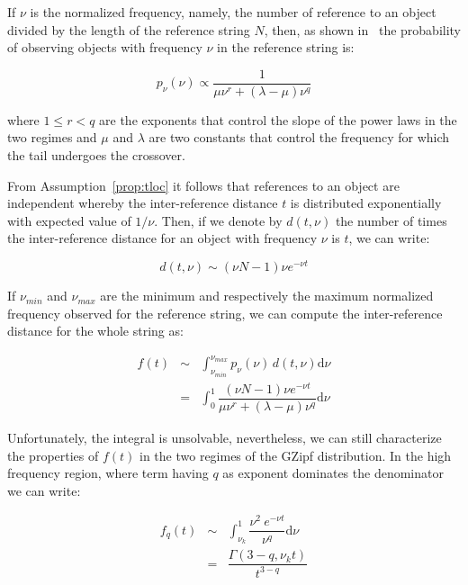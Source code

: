 \documentclass[twocolumn, 10pt]{article}
\theoremstyle{plain}
\begin{document}
If $\nu$ is the normalized frequency, namely, the number of reference to an
object divided by the length of the reference string $N$, then, as shown
in~\cite{montemurro:gzipf} the probability of observing objects with frequency
$\nu$ in the reference string is:

\begin{equation}
    p_{\nu}(\nu)\propto\dfrac{1}{\mu\nu^r+(\lambda-\mu)\nu^q}
    \label{eq:gzipf_pdf}
\end{equation}

\noindent where $1 \le r<q$ are the exponents that control the slope of the
power laws in the two regimes and $\mu$ and $\lambda$ are two constants that
control the frequency for which the tail undergoes the crossover. 

From Assumption~\ref{prop:tloc} it follows that references to an object are
independent whereby the inter-reference distance $t$ is distributed exponentially
with expected value of $1/\nu$. Then, if we denote by $d(t, \nu)$ the
number of times the inter-reference distance for an object with frequency
$\nu$ is $t$, we can write:

\begin{equation}
    d(t, \nu) \sim (\nu N-1) \nu e^{-\nu t} 
    \label{eq:dtf}
\end{equation}

If $\nu_{min}$ and $\nu_{max}$ are the minimum and respectively the
maximum normalized frequency observed for the reference string, we can compute
the inter-reference distance for the whole string as:

\begin{eqnarray}
    f(t) &\sim& \int_{\nu_{min}}^{\nu_{max}} p_{\nu}(\nu)\,d(t,\nu) \mathrm{d}\nu \nonumber \\
    &=& \int_0^1 \dfrac{(\nu N-1)\nu e^{-\nu t} }{\mu\nu^r+(\lambda-\mu)\nu^q} \mathrm{d}\nu
    \label{eq:ir}
\end{eqnarray}

Unfortunately, the integral is unsolvable, nevertheless, we can still characterize the
properties of $f(t)$ in the two regimes of the GZipf
distribution. In the high frequency region, where term having $q$ as exponent dominates the
denominator we can write:

\begin{eqnarray}
    f_q(t)  &\sim& \int_{\nu_k}^1 \dfrac{\nu^2\ e^{-\nu t} }{\nu^q}
    \mathrm{d}\nu \nonumber \\
                        &=& \dfrac{\Gamma(3-q, \nu_k t)}{t^{3-q}} 
    \label{eq:ir_q}
\end{eqnarray}
\end{document}
